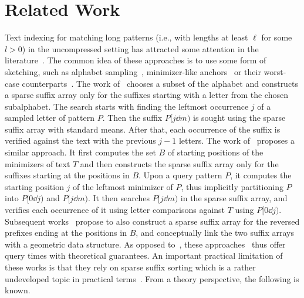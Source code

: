 \section{Related Work}
\label{sec:related}

Text indexing for matching long patterns (i.e., with lengths at least $\ell$ for some $l > 0$) in the uncompressed setting
has attracted some attention in the literature~\cite{DBLP:journals/jda/ClaudeNPST12,DBLP:journals/spe/GrabowskiR17,DBLP:conf/esa/LoukidesP21,DBLP:journals/tkde/LoukidesPS23,DBLP:journals/pvldb/AyadLP23,DBLP:journals/corr/abs-2407-11819}. The common idea of these approaches is to use some form of sketching, such as alphabet sampling~\cite{DBLP:journals/jda/ClaudeNPST12}, minimizer-like anchors~\cite{DBLP:journals/spe/GrabowskiR17,DBLP:conf/esa/LoukidesP21,DBLP:journals/tkde/LoukidesPS23,DBLP:journals/pvldb/AyadLP23} or their worst-case counterparts~\cite{DBLP:journals/corr/abs-2407-11819}. The work of~\cite{DBLP:journals/jda/ClaudeNPST12} chooses a subset of the alphabet and constructs a sparse suffix array only for the suffixes starting with a letter from the chosen 
subalphabet. The search starts with finding the leftmost occurrence $j$ of a sampled letter of 
pattern $P$. Then the suffix $P[j\dd m)$ is sought
using the sparse suffix array with standard means. After that, each occurrence of
the suffix is verified against the text with the previous $j - 1$ letters.
The work of~\cite{DBLP:journals/spe/GrabowskiR17} proposes a similar approach. It first computes the set $B$ of starting positions of the minimizers of text $T$
and then constructs the sparse suffix array only for the suffixes starting at the positions in $B$.
Upon a query pattern $P$, it computes the starting position $j$ of the leftmost minimizer of $P$,
thus implicitly partitioning $P$ into $P[0\dd j)$ and $P[j\dd m)$. It then searches
$P[j\dd m)$ in the sparse suffix array, and verifies each occurrence of it using letter comparisons
against $T$ using $P[0\dd j)$. Subsequent works~\cite{DBLP:conf/esa/LoukidesP21,DBLP:journals/tkde/LoukidesPS23,DBLP:journals/pvldb/AyadLP23} propose to also construct a sparse suffix array for the reversed prefixes
ending at the positions in $B$, and conceptually link the two suffix arrays with a geometric data structure.
As opposed to~\cite{DBLP:journals/jda/ClaudeNPST12,DBLP:journals/spe/GrabowskiR17}, these approaches~\cite{DBLP:conf/esa/LoukidesP21,DBLP:journals/tkde/LoukidesPS23,DBLP:journals/pvldb/AyadLP23} thus offer query times with theoretical guarantees. An important practical limitation of these works is that they rely on sparse suffix sorting which is a rather undeveloped topic in practical terms~\cite{DBLP:conf/latin/AyadLPV24}.
From a theory perspective, the following is known.

